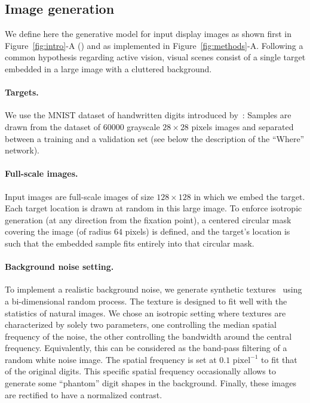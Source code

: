 \subsection*{Image generation}
We define here the generative model for input display images as shown first in Figure~\ref{fig:intro}-A (\DIS ) and as implemented in Figure~\ref{fig:methods}-A. Following a common hypothesis regarding active vision, visual scenes consist of a single target embedded in a large image with a cluttered background.

\paragraph{Targets.}
We use the MNIST dataset of handwritten digits introduced by~\cite{Lecun1998}: %
Samples are drawn from the dataset of $60000$ grayscale $28\times 28$ pixels images and separated between a training and a validation set (see below the description of the ``Where'' network).

\paragraph{Full-scale images.}
Input images are full-scale images of size $128\times 128$ in which we embed the target.
Each target location is drawn at random in this large image. To enforce isotropic generation (at any direction from the fixation point), a centered circular mask covering the image (of radius $64$ pixels) is defined, and the target's location is such that the embedded sample fits entirely into that circular mask.

\paragraph{Background noise setting.} To implement a realistic background noise, we generate synthetic textures~\cite{Sanz12} using a bi-dimensional random process. %
The texture is designed to fit well with the statistics of natural images. We chose an isotropic setting where textures are characterized by solely two parameters, one controlling the median spatial frequency of the noise, the other controlling the bandwidth around the central frequency. Equivalently, this can be considered as the band-pass filtering of a random white noise image. The spatial frequency is set at $0.1\text{ pixel}^{-1}$ to fit that of the original digits. This specific spatial frequency occasionally allows to generate some ``phantom'' digit shapes in the background. Finally, these images are rectified to have a normalized contrast.

